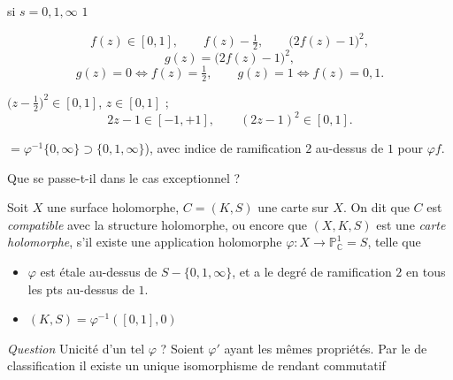 \documentclass[11pt,a4paper]{article}
\begin{document}
si \struck{\ill{} \ill{}} $s = 0, 1, \infty$  \ill{} \ill{} $1$
\ill{} \ill{} \ill{} \ill{} \ill{}


\[
  f(z) \in [0,1], \qquad f(z) - \tfrac12, \qquad \bigl(2f(z) - 1\bigr)^{2},
\]
\[
  g(z) = \bigl(2f(z) - 1\bigr)^{2},
\]
\[
  g(z) = 0 \iff f(z) = \tfrac12, \qquad g(z) = 1 \iff f(z) = 0, 1 .
\]


$\bigl(z - \tfrac12\bigr)^{2} \in [0,1]$, \quad {} \quad $z \in [0,1]$ ;
\struck{$z\bigl(z - \tfrac12\bigr) \in [\ldots$}
\[
  2z - 1 \in [-1, +1], \qquad (2z-1)^{2} \in [0, 1] .
\]

$= \varphi^{-1}\{0, \infty\} \supset \{0, 1, \infty\}$), avec indice de
ramification $2$ au-dessus de $1$ pour $\varphi f$.

\struck{\ill{}} Que se passe-t-il dans le cas exceptionnel ?

 Soit $X$ une surface holomorphe, $C = (K, S)$ une
carte sur $X$. On dit que $C$ est \emph{compatible}
avec la structure holomorphe, ou encore
que $(X, K, S)$ est une \emph{carte holomorphe},
s'il existe une application holomorphe
$\varphi : X \longrightarrow \mathbb{P}^{1}_{\mathbb{C}} = S$, telle que
\begin{itemize}
  \item[a)] $\varphi$ est étale au-dessus de $S - \{0, 1, \infty\}$, et
  a le degré de ramification $2$ en tous les
  pts au-dessus de $1$.
  \item[b)] \struck{\ill{}} $(K, S) = \varphi^{-1}([0,1], 0)$ 
\end{itemize}

\emph{Question} Unicité d'un tel $\varphi$ ? Soient $\varphi'$ ayant
les mêmes propriétés. Par le  de classification
il existe un unique isomorphisme de
  rendant commutatif
\end{document}
